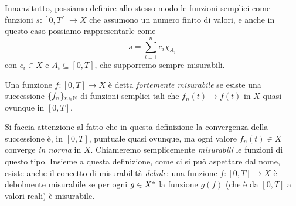 Innanzitutto, possiamo definire allo stesso modo le funzioni semplici come funzioni $s\colon[0,T]\to X$ che assumono un numero finito di valori, e anche in questo caso possiamo rappresentarle come
\begin{equation}
    s=\sum_{i=1}^nc_i\chi_{A_i}
    \label{eq:funzione-semplice-banach}
\end{equation}
con $c_i\in X$ e $A_i\subseteq[0,T]$, che supporremo sempre misurabili.
\begin{definizione} \label{d:funzione-fortemente-misurabile}
    Una funzione $f\colon[0,T]\to X$ è detta \emph{fortemente misurabile} se esiste una successione $\{f_n\}_{n\in\mathbb{N}}$ di funzioni semplici tali che $f_n(t)\to f(t)$ in $X$ quasi ovunque in $[0,T]$.
\end{definizione}
Si faccia attenzione al fatto che in questa definizione la convergenza della successione è, in $[0,T]$, puntuale quasi ovunque, ma ogni valore $f_n(t)\in X$ converge \emph{in norma} in $X$.
Chiameremo semplicemente \emph{misurabili} le funzioni di questo tipo.
Insieme a questa definizione, come ci si può aspettare dal nome, esiste anche il concetto di misurabilità \emph{debole}: una funzione $f\colon[0,T]\to X$ è debolmente misurabile se per ogni $g\in X^{\ast}$ la funzione $g(f)$ (che è da $[0,T]$ a valori reali) è misurabile.

